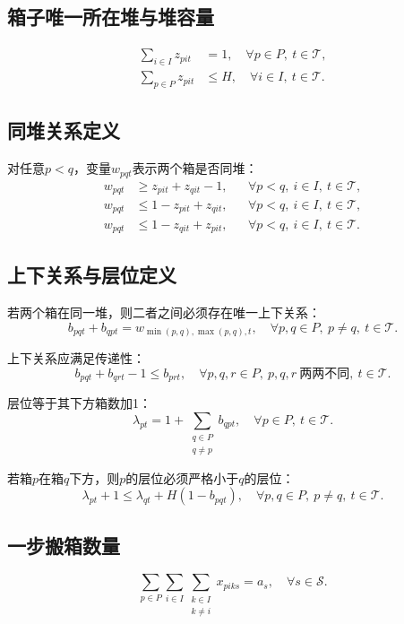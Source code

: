 \documentclass[11pt,a4paper]{ctexart}
\begin{document}
\subsection{箱子唯一所在堆与堆容量}
\begin{align}
\sum_{i\in I} z_{pit} &= 1,\quad \forall p\in P,\ t\in\mathcal{T},\\
\sum_{p\in P} z_{pit} &\le H,\quad \forall i\in I,\ t\in\mathcal{T}.
\end{align}

\subsection{同堆关系定义}
对任意$p<q$，变量$w_{pqt}$表示两个箱是否同堆：
\begin{align}
w_{pqt} &\ge z_{pit}+z_{qit}-1,
&& \forall p<q,\ i\in I,\ t\in\mathcal{T},\\
w_{pqt} &\le 1-z_{pit}+z_{qit},
&& \forall p<q,\ i\in I,\ t\in\mathcal{T},\\
w_{pqt} &\le 1-z_{qit}+z_{pit},
&& \forall p<q,\ i\in I,\ t\in\mathcal{T}.
\end{align}

\subsection{上下关系与层位定义}
若两个箱在同一堆，则二者之间必须存在唯一上下关系：
\begin{equation}
b_{pqt}+b_{qpt}=w_{\min(p,q),\max(p,q),t},
\quad \forall p,q\in P,\ p\ne q,\ t\in\mathcal{T}.
\end{equation}

上下关系应满足传递性：
\begin{equation}
b_{pqt}+b_{qrt}-1 \le b_{prt},
\quad \forall p,q,r\in P,\ p,q,r\ \text{两两不同},\ t\in\mathcal{T}.
\end{equation}

层位等于其下方箱数加1：
\begin{equation}
\lambda_{pt} = 1+\sum_{\substack{q\in P\\q\ne p}} b_{qpt},
\quad \forall p\in P,\ t\in\mathcal{T}.
\end{equation}

若箱$p$在箱$q$下方，则$p$的层位必须严格小于$q$的层位：
\begin{equation}
\lambda_{pt}+1 \le \lambda_{qt}+H(1-b_{pqt}),
\quad \forall p,q\in P,\ p\ne q,\ t\in\mathcal{T}.
\end{equation}

\subsection{一步搬箱数量}
\begin{equation}
\sum_{p\in P}\sum_{i\in I}\sum_{\substack{k\in I\\k\ne i}} x_{piks}
= a_s,\quad \forall s\in\mathcal{S}.
\end{equation}
\end{document}

